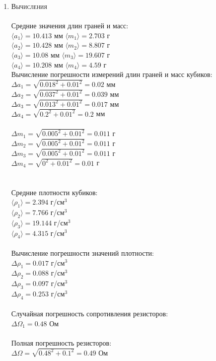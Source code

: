 \documentclass[12pt]{article}
\begin{document}
\begin{enumerate}
    \item \large\textsc{Вычисления} \\
    \\
    Средние значения длин граней и масс: \\
    $ \langle a_1 \rangle = 10.413 $ мм $ \langle m_1 \rangle = 2.703 $ г \\
    $ \langle a_2 \rangle = 10.428 $ мм $ \langle m_2 \rangle = 8.807 $ г \\
    $ \langle a_3 \rangle = 10.08 $ мм $ \langle m_3 \rangle = 19.607 $ г \\
    $ \langle a_4 \rangle = 10.208 $ мм $ \langle m_4 \rangle = 4.59 $ г \\
    Вычисление погрешности измерений длин граней и масс кубиков: \\ 
    $\Delta a_1 = \sqrt{0.018^2 + 0.01^2} = 0.02$ мм \\
    $\Delta a_2 = \sqrt{0.037^2 + 0.01^2} = 0.039$ мм\\
    $\Delta a_3 = \sqrt{0.013^2 + 0.01^2} = 0.017$ мм\\
    $\Delta a_4 = \sqrt{0.2^2 + 0.01^2} = 0.2$ мм\\
    \\
    $\Delta m_1 = \sqrt{0.005^2 + 0.01^2} = 0.011$ г \\
    $\Delta m_2 = \sqrt{0.005^2 + 0.01^2} = 0.011$ г \\
    $\Delta m_3 = \sqrt{0.005^2 + 0.01^2} = 0.011$ г \\
    $\Delta m_4 = \sqrt{0^2 + 0.01^2} = 0.01$ г \\ \\ \\
    Средние плотности кубиков: \\
    $ \langle \rho_1 \rangle = 2.394 $ г/см$^3$ \\
    $ \langle \rho_2 \rangle = 7.766 $ г/см$^3$ \\
    $ \langle \rho_3 \rangle = 19.144 $ г/см$^3$ \\
    $ \langle \rho_4 \rangle = 4.315 $ г/см$^3$ \\ \\
    Вычисление погрешности значений плотности:\\
    $\Delta \rho_1 = 0.017$ г/см$^3$\\
    $\Delta \rho_2 = 0.088$ г/см$^3$\\
    $\Delta \rho_3 = 0.097$ г/см$^3$\\
    $\Delta \rho_4 = 0.253$ г/см$^3$\\ \\
    Случайная погрешность сопротивления резисторов: \\
    $\Delta \Omega_1 = 0.48 $ Ом \\ \\
    Полная погрешность резисторов: \\
    $\Delta \Omega = \sqrt{0.48^2 + 0.1^2} = 0.49 $ Ом
    

\end{enumerate}
\end{document}
